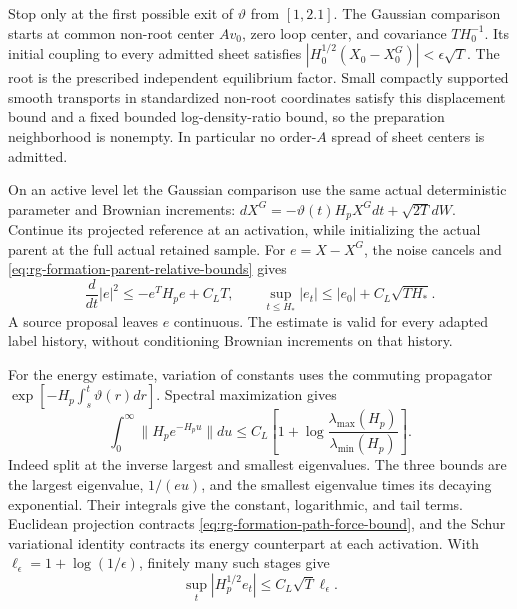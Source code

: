Stop only at the first possible exit of $\vartheta$ from $[1,2.1]$.
The Gaussian comparison starts at common non-root center $Av_0$,
zero loop center, and covariance $TH_0^{-1}$. Its initial coupling
to every admitted sheet satisfies
$|H_0^{1/2}(X_0-X_0^G)|<\epsilon\sqrt T$. The root is the prescribed
independent equilibrium factor. Small compactly supported smooth
transports in standardized non-root coordinates satisfy this
displacement bound and a fixed bounded log-density-ratio bound, so the
preparation neighborhood is nonempty. In particular no order-$A$
spread of sheet centers is admitted.

On an active level let the Gaussian comparison use the same actual
deterministic parameter and Brownian increments:
$dX^G=-\vartheta(t)H_pX^Gdt+\sqrt{2T}dW$. Continue its projected
reference at an activation, while initializing the actual parent at
the full actual retained sample. For $e=X-X^G$, the noise cancels and
\cref{eq:rg-formation-parent-relative-bounds} gives
\begin{equation}
 \frac d{dt}|e|^2\le-e^TH_pe+C_LT,
 \qquad
 \sup_{t\le H_*}|e_t|
 \le |e_0|+C_L\sqrt{TH_*}.
 \label{eq:rg-formation-path-force-bound}
\end{equation}
A source proposal leaves $e$ continuous. The estimate is valid for
every adapted label history, without conditioning Brownian increments
on that history.

For the energy estimate, variation of constants uses the commuting
propagator $\exp[-H_p\int_s^t\vartheta(r)dr]$. Spectral maximization
gives
\begin{equation}
 \int_0^\infty\|H_pe^{-H_pu}\|du
 \le C_L\left[1+\log
       \frac{\lambda_{\max}(H_p)}{\lambda_{\min}(H_p)}\right].
 \label{eq:rg-formation-logarithmic-propagator}
\end{equation}
Indeed split at the inverse largest and smallest eigenvalues. The
three bounds are the largest eigenvalue, $1/(eu)$, and the smallest
eigenvalue times its decaying exponential. Their integrals give the
constant, logarithmic, and tail terms. Euclidean projection contracts
\cref{eq:rg-formation-path-force-bound}, and the Schur variational
identity contracts its energy counterpart at each activation. With
$\ell_\epsilon=1+\log(1/\epsilon)$, finitely many such stages give
\begin{equation}
 \sup_t|H_p^{1/2}e_t|\le C_L\sqrt T\ell_\epsilon.
 \label{eq:rg-formation-energy-force-bound}
\end{equation}

